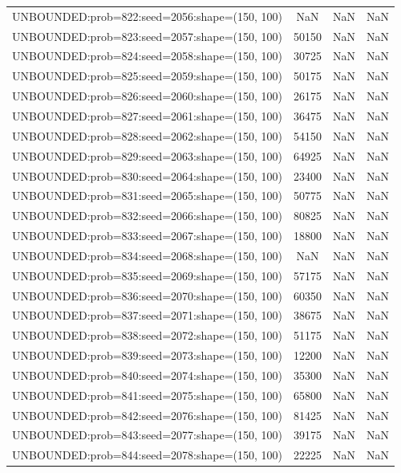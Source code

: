 \begin{longtable}{lccc}
UNBOUNDED:prob=822:seed=2056:shape=(150, 100) &   NaN &   NaN &    NaN \\
UNBOUNDED:prob=823:seed=2057:shape=(150, 100) & 50150 &   NaN &    NaN \\
UNBOUNDED:prob=824:seed=2058:shape=(150, 100) & 30725 &   NaN &    NaN \\
UNBOUNDED:prob=825:seed=2059:shape=(150, 100) & 50175 &   NaN &    NaN \\
UNBOUNDED:prob=826:seed=2060:shape=(150, 100) & 26175 &   NaN &    NaN \\
UNBOUNDED:prob=827:seed=2061:shape=(150, 100) & 36475 &   NaN &    NaN \\
UNBOUNDED:prob=828:seed=2062:shape=(150, 100) & 54150 &   NaN &    NaN \\
UNBOUNDED:prob=829:seed=2063:shape=(150, 100) & 64925 &   NaN &    NaN \\
UNBOUNDED:prob=830:seed=2064:shape=(150, 100) & 23400 &   NaN &    NaN \\
UNBOUNDED:prob=831:seed=2065:shape=(150, 100) & 50775 &   NaN &    NaN \\
UNBOUNDED:prob=832:seed=2066:shape=(150, 100) & 80825 &   NaN &    NaN \\
UNBOUNDED:prob=833:seed=2067:shape=(150, 100) & 18800 &   NaN &    NaN \\
UNBOUNDED:prob=834:seed=2068:shape=(150, 100) &   NaN &   NaN &    NaN \\
UNBOUNDED:prob=835:seed=2069:shape=(150, 100) & 57175 &   NaN &    NaN \\
UNBOUNDED:prob=836:seed=2070:shape=(150, 100) & 60350 &   NaN &    NaN \\
UNBOUNDED:prob=837:seed=2071:shape=(150, 100) & 38675 &   NaN &    NaN \\
UNBOUNDED:prob=838:seed=2072:shape=(150, 100) & 51175 &   NaN &    NaN \\
UNBOUNDED:prob=839:seed=2073:shape=(150, 100) & 12200 &   NaN &    NaN \\
UNBOUNDED:prob=840:seed=2074:shape=(150, 100) & 35300 &   NaN &    NaN \\
UNBOUNDED:prob=841:seed=2075:shape=(150, 100) & 65800 &   NaN &    NaN \\
UNBOUNDED:prob=842:seed=2076:shape=(150, 100) & 81425 &   NaN &    NaN \\
UNBOUNDED:prob=843:seed=2077:shape=(150, 100) & 39175 &   NaN &    NaN \\
UNBOUNDED:prob=844:seed=2078:shape=(150, 100) & 22225 &   NaN &    NaN \\

\end{longtable}
